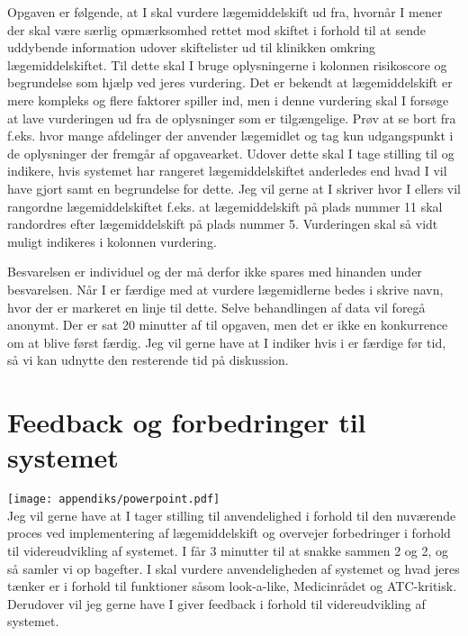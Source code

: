 Opgaven er følgende, at I skal vurdere lægemiddelskift ud fra, hvornår I mener der skal være særlig opmærksomhed rettet mod skiftet i forhold til at sende uddybende information udover skiftelister ud til klinikken omkring lægemiddelskiftet. Til dette skal I bruge oplysningerne i kolonnen risikoscore og begrundelse som hjælp ved jeres vurdering. Det er bekendt at lægemiddelskift er mere kompleks og flere faktorer spiller ind, men i denne vurdering skal I forsøge at lave vurderingen ud fra de oplysninger som er tilgængelige. Prøv at se bort fra f.eks. hvor mange afdelinger der anvender lægemidlet og tag kun udgangspunkt i de oplysninger der fremgår af opgavearket. Udover dette skal I tage stilling til og indikere, hvis systemet har rangeret lægemiddelskiftet anderledes end hvad I vil have gjort samt en begrundelse for dette. Jeg vil gerne at I skriver hvor I ellers vil rangordne lægemiddelskiftet f.eks. at lægemiddelskift på plads nummer 11 skal randordres efter lægemiddelskift på plads nummer 5. Vurderingen skal så vidt muligt indikeres i kolonnen vurdering.

Besvarelsen er individuel og der må derfor ikke spares med hinanden under besvarelsen. Når I er færdige med at vurdere lægemidlerne bedes i skrive navn, hvor der er markeret en linje til dette. Selve behandlingen af data vil foregå anonymt. Der er sat 20 minutter af til opgaven, men det er ikke en konkurrence om at blive først færdig. Jeg vil gerne have at I indiker hvis i er færdige før tid, så vi kan udnytte den resterende tid på diskussion.

\section{Feedback og forbedringer til systemet}
\texttt{[image: appendiks/powerpoint.pdf]} \\ 

Jeg vil gerne have at I tager stilling til anvendelighed i forhold til den nuværende proces ved implementering af lægemiddelskift og overvejer forbedringer i forhold til videreudvikling af systemet. I får 3 minutter til at snakke sammen 2 og 2, og så samler vi op bagefter. I skal  vurdere anvendeligheden af systemet og hvad jeres tænker er i forhold til funktioner såsom  look-a-like, Medicinrådet og ATC-kritisk. Derudover vil jeg gerne have I giver feedback i forhold til videreudvikling af systemet.

